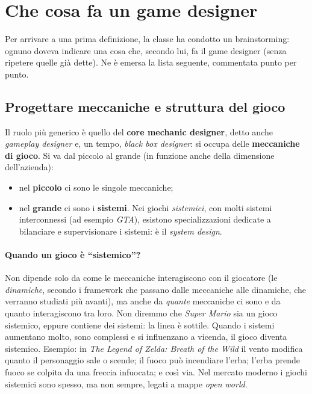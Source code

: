 \section{Che cosa fa un game designer}
\label{sec:cosa-fa}



Per arrivare a una prima definizione, la classe ha condotto un brainstorming:
ognuno doveva indicare una cosa che, secondo lui, fa il game designer (senza
ripetere quelle già dette). Ne è emersa la lista seguente, commentata punto
per punto.

\subsection{Progettare meccaniche e struttura del gioco}

Il ruolo più generico è quello del \textbf{core mechanic designer}, detto
anche \emph{gameplay designer} e, un tempo, \emph{black box designer}: si
occupa delle \textbf{meccaniche di gioco}. Si va dal piccolo al grande (in
funzione anche della dimensione dell'azienda):
\begin{itemize}
  \item nel \textbf{piccolo} ci sono le singole meccaniche;
  \item nel \textbf{grande} ci sono i \textbf{sistemi}. Nei giochi
        \emph{sistemici}, con molti sistemi interconnessi (ad esempio
        \emph{GTA}), esistono specializzazioni dedicate a bilanciare e
        supervisionare i sistemi: è il \emph{system design}.
\end{itemize}

\paragraph{Quando un gioco è ``sistemico''?}
Non dipende solo da come le meccaniche interagiscono con il giocatore (le
\emph{dinamiche}, secondo i framework che passano dalle meccaniche alle
dinamiche, che verranno studiati più avanti), ma anche da \emph{quante}
meccaniche ci sono e da quanto interagiscono tra loro. Non diremmo che
\emph{Super Mario} sia un gioco sistemico, eppure contiene dei sistemi: la
linea è sottile. Quando i sistemi aumentano molto, sono complessi e si
influenzano a vicenda, il gioco diventa sistemico. Esempio: in \emph{The
Legend of Zelda: Breath of the Wild} il vento modifica quanto il personaggio
sale o scende; il fuoco può incendiare l'erba; l'erba prende fuoco se colpita
da una freccia infuocata; e così via. Nel mercato moderno i giochi sistemici
sono spesso, ma non sempre, legati a mappe \emph{open world}.

